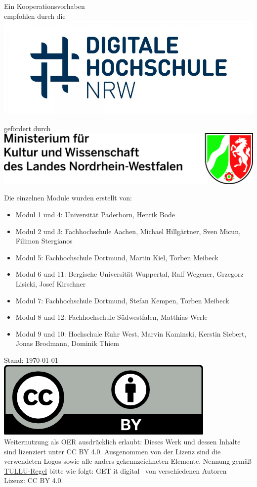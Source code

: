 \documentclass[twoside, a4paper]{article}
\begin{document}
\begin{minipage}[t]{0.36\textwidth}
	Ein Kooperationsvorhaben \\
	empfohlen durch die\\[0.3cm]
	\includegraphics[width=\linewidth]{dh_nrw.jpg}
\end{minipage}
\hfill
\begin{minipage}[t]{0.5\textwidth}
	gefördert durch\\[1cm]
	\includegraphics[width=\linewidth]{mkw.jpg}
\end{minipage}



\newpage
\pagestyle{fancyplain}

Die einzelnen Module wurden erstellt von:
\begin{itemize}
	\item Modul 1 und 4: Universität Paderborn, Henrik Bode
	\item Modul 2 und 3: Fachhochschule Aachen, Michael Hillgärtner, Sven Micun, Filimon Stergianos
	\item Modul 5: Fachhochschule Dortmund, Martin Kiel, Torben Meibeck
	\item Modul 6 und 11: Bergische Universität Wuppertal, Ralf Wegener, Grzegorz Lisicki, Josef Kirschner
	\item Modul 7: Fachhochschule Dortmund, Stefan Kempen, Torben Meibeck
	\item Modul 8 und 12: Fachhochschule Südwestfalen, Matthias Werle
	\item Modul 9 und 10: Hochschule Ruhr West, Marvin Kaminski, Kerstin Siebert, Jonas Brodmann, Dominik Thiem
\end{itemize}

\vfill
{\hfill Stand: \today}\\
{\includegraphics[width=0.2\linewidth]{by.png}}\\
Weiternutzung als OER ausdrücklich erlaubt: Dieses Werk und dessen Inhalte sind lizenziert unter CC BY 4.0. Ausgenommen von der Lizenz
sind die verwendeten Logos sowie alle anders gekennzeichneten Elemente. Nennung gemäß \href{https://open-educational-resources.de/oer-tullu-regel/}{TULLU-Regel} bitte wie folgt: \glqq GET it digital \grqq\ von verschiedenen Autoren \\ Lizenz: CC BY 4.0.
\end{document}
